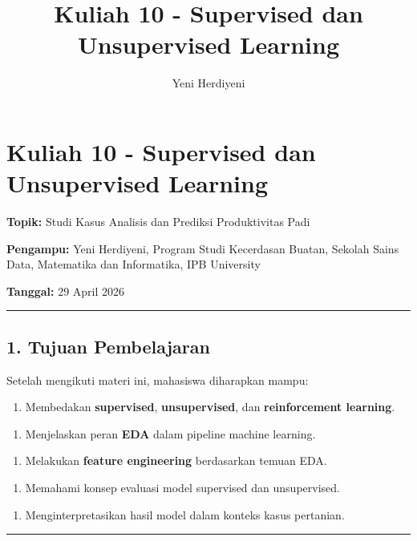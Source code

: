 \documentclass[12pt,a4paper]{article}
\title{Kuliah 10 - Supervised dan Unsupervised Learning}
\author{Yeni Herdiyeni}
\date{}
\begin{document}
\maketitle
\tableofcontents
\newpage

\section{Kuliah 10 - Supervised dan Unsupervised Learning}

\textbf{Topik:} Studi Kasus Analisis dan Prediksi Produktivitas Padi  

\textbf{Pengampu:} Yeni Herdiyeni, Program Studi Kecerdasan Buatan, Sekolah Sains Data, Matematika dan Informatika, IPB University  

\textbf{Tanggal:} 29 April 2026


\hrule


\subsection{1. Tujuan Pembelajaran}

Setelah mengikuti materi ini, mahasiswa diharapkan mampu:


\begin{enumerate}
\item Membedakan \textbf{supervised}, \textbf{unsupervised}, dan \textbf{reinforcement learning}.
\end{enumerate}

\begin{enumerate}
\item Menjelaskan peran \textbf{EDA} dalam pipeline machine learning.
\end{enumerate}

\begin{enumerate}
\item Melakukan \textbf{feature engineering} berdasarkan temuan EDA.
\end{enumerate}

\begin{enumerate}
\item Memahami konsep evaluasi model supervised dan unsupervised.
\end{enumerate}

\begin{enumerate}
\item Menginterpretasikan hasil model dalam konteks kasus pertanian.
\end{enumerate}


\hrule
\end{document}
